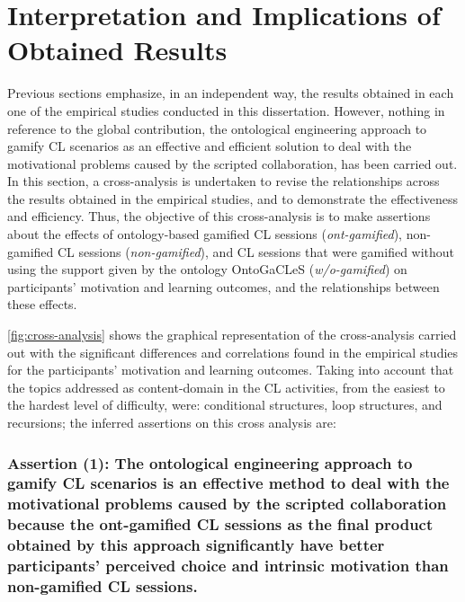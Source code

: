 \newpage
\section{Interpretation and Implications of Obtained Results}
\label{sec:interpretation-implications} 

Previous sections emphasize, in an independent way, the results obtained in each one of the empirical studies conducted in this dissertation. However, nothing in reference to the global contribution, the ontological engineering approach to gamify CL scenarios as an effective and efficient solution to deal with the motivational problems caused by the scripted collaboration, has been carried out. In this section, a cross-analysis is undertaken to revise the relationships across the results obtained in the empirical studies, and to demonstrate the effectiveness and efficiency. Thus, the objective of this cross-analysis is to make assertions about the effects of ontology-based gamified CL sessions (\emph{ont-gamified}), non-gamified CL sessions (\emph{non-gamified}), and CL sessions that were gamified without using the support given by the ontology OntoGaCLeS (\emph{w/o-gamified}) on participants' motivation and learning outcomes, and the relationships between these effects.

\autoref{fig:cross-analysis} shows the graphical representation of the cross-analysis carried out with the significant differences and correlations found in the empirical studies for the participants' motivation and learning outcomes.
Taking into account that the topics addressed as content-domain in the CL activities, from the easiest to the hardest level of difficulty, were: conditional structures, loop structures, and recursions; the inferred assertions on this cross analysis are:

\subsubsection*{Assertion (1): The ontological engineering approach to gamify CL scenarios is an effective method to deal with the motivational problems caused by the scripted collaboration because the ont-gamified CL sessions as the final product obtained by this approach significantly have better participants' perceived choice and intrinsic motivation than non-gamified CL sessions.}

